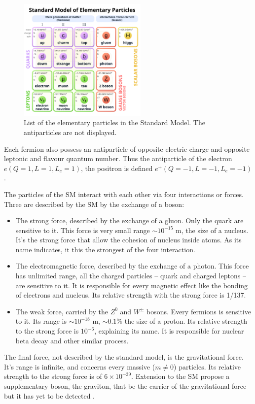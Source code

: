 \begin{figure}
  \centering
  \includegraphics[height=6cm]{images/neutrinos/sm.png}
  \caption{List of the elementary particles in the Standard Model. The antiparticles are not displayed.}
  \label{fig:neutrino:sm}
\end{figure}

Each fermion also possess an antiparticle of opposite electric charge and opposite leptonic and flavour quantum number. Thus the antiparticle of the electron $e (Q=1, L=1, L_e=1)$, the positron is defined $e^+ (Q=-1, L=-1, L_e=-1)$.

The particles of the SM interact with each other via four interactions or forces. Three are described by the SM by the exchange of a boson:
\begin{itemize}
  \item The strong force, described by the exchange of a gluon. Only the quark are sensitive to it. This force is very small range $\sim 10^{-15}$ m, the size of a nucleus. It's the strong force that allow the cohesion of nucleus inside atoms. As its name indicates, it this the strongest of the four interaction.
  \item The electromagnetic force, described by the exchange of a photon. This force has unlimited range, all the charged particles -- quark and charged leptons -- are sensitive to it. It is responsible for every magnetic effect like the bonding of electrons and nucleus. Its relative strength with the strong force is 1/137.
  \item The weak force, carried by the $Z^0$ and $W^{\pm}$ bosons. Every fermions is sensitive to it. Its range is $\sim 10^{-18}$ m, $\sim 0.1\%$ the size of a proton. Its relative strength to the strong force is $10^{-6}$, explaining its name. It is responsible for nuclear beta decay and other similar process.
\end{itemize}

The final force, not described by the standard model, is the gravitational force. It's range is infinite, and concerns every massive ($m \neq 0$) particles. Its relative strength to the strong force is of $6\times 10^{-39}$. Extension to the SM propose a supplementary boson, the graviton, that be the carrier of the gravitational force but it has yet to be detected \cite{ParticleDataGroup:2024cfk, carney_graviton_2024}.

